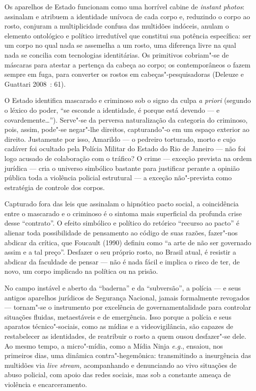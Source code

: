 Os aparelhos de Estado funcionam como uma horrível cabine de
\emph{instant photos}: assinalam e atribuem a identidade unívoca de cada
corpo e, reduzindo o corpo ao rosto, conjuram a multiplicidade confusa
das multidões indóceis, anulam o elemento ontológico e político
irredutível que constitui sua potência específica: ser um corpo no qual
nada se assemelha a um rosto, uma diferença livre na qual nada se
concilia com tecnologias identitárias. Os primitivos cobriam"-se de
máscaras para atestar a pertença da cabeça ao corpo; os contemporâneos o
fazem sempre em fuga, para converter os rostos em cabeças"-pesquisadoras
(Deleuze e Guattari 2008~: 61).

O Estado identifica mascarado e criminoso sob o signo da culpa \emph{a
priori }(segundo o léxico do poder, ``se esconde a identidade, é porque
está devendo --- e covardemente\ldots{}''). Serve"-se da perversa naturalização
da categoria do criminoso, pois, assim, pode"-se negar"-lhe direitos,
capturando"-o em um espaço exterior ao direito. Justamente por isso,
Amarildo --- o pedreiro torturado, morto e cujo cadáver foi ocultado pela
Polícia Militar do Estado do Rio de Janeiro --- não foi logo acusado de
colaboração com o tráfico? O crime --- exceção prevista na ordem jurídica
--- cria o universo simbólico bastante para justificar perante a opinião
pública toda a violência policial estrutural --- a exceção não"-prevista
como estratégia de controle dos corpos.

Capturado fora das leis que assinalam o hipnótico pacto social, a
coincidência entre o mascarado e o criminoso é o sintoma mais
superficial da profunda crise desse ``contrato''. O efeito simbólico e
político do retórico ``recurso ao pacto'' é alienar toda possibilidade
de pensamento ao código de suas razões, fazer"-nos abdicar da crítica,
que Foucault (1990) definiu como ``a arte de não ser governado assim e a
tal preço''. Desfazer o seu próprio rosto, no Brasil atual, é resistir a
abdicar da faculdade de pensar --- não é nada fácil e implica o risco de
ter, de novo, um corpo implicado na política ou na prisão.

No campo instável e aberto da ``baderna'' e da ``subversão'', a polícia
--- e seus antigos aparelhos jurídicos de Segurança Nacional, jamais
formalmente revogados --- tornam"-se o instrumento por excelência de
governamentalidade para controlar situações fluidas, metaestáveis e de
emergência. Isso porque a polícia e seus aparatos técnico"-sociais, como
as mídias e a videovigilância, são capazes de restabelecer as
identidades, de reatribuir o rosto a quem ousou desfazer"-se dele. Ao
mesmo tempo, a micro"-mídia, como a Mídia Ninja \emph{e.g.}, ensaiou, nos
primeiros dias, uma dinâmica contra"-hegemônica: transmitindo a
insurgência das multidões via \emph{live stream, }acompanhando e
denunciando ao vivo situações de abuso policial, com apoio das redes
sociais, mas sob a constante ameaça de violência e encarceramento.

